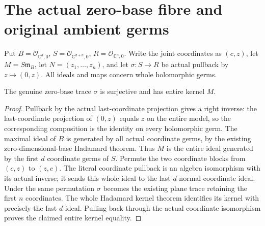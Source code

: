 \section{The actual zero-base fibre and original ambient germs}

Put $B=\mathcal O_{\mathbb C^d,0}$, $S=\mathcal O_{\mathbb C^{d+n},0}$,
$R=\mathcal O_{\mathbb C^n,0}$. Write the joint coordinates as $(c,z)$,
let $M=S\mathfrak m_B$, let $N=(z_1,\ldots,z_n)$, and let
$\sigma:S\to R$ be actual pullback by $z\mapsto(0,z)$.
All ideals and maps concern whole holomorphic germs.

\begin{theorem}
\label{hir:actual-joint-base-fibre-kernel}
\leanok
{}
The genuine zero-base trace $\sigma$ is surjective and has entire kernel $M$.
\end{theorem}
\begin{proof}
Pullback by the actual last-coordinate projection gives a right inverse:
the last-coordinate projection of $(0,z)$ equals $z$ on the entire model,
so the corresponding composition is the identity on every holomorphic germ.
The maximal ideal of $B$ is generated by all actual coordinate germs,
by the existing zero-dimensional-base Hadamard theorem. Thus $M$ is the
entire ideal generated by the first $d$ coordinate germs of $S$.
Permute the two coordinate blocks from $(c,z)$ to $(z,c)$. The literal
coordinate pullback is an algebra isomorphism with its actual inverse;
it sends this whole ideal to the last-$d$ normal-coordinate ideal.
Under the same permutation $\sigma$ becomes the existing plane trace
retaining the first $n$ coordinates. The whole Hadamard kernel theorem
identifies its kernel with precisely the last-$d$ ideal. Pulling back
through the actual coordinate isomorphism proves the claimed entire
kernel equality.
\end{proof}

